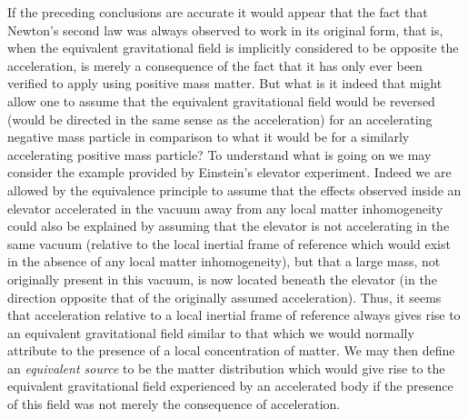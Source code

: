 \documentclass[notitlepage,12pt]{report}
\begin{document}
If the preceding conclusions are accurate it would appear that the fact that Newton's second law was always observed to work in its original form, that is, when the equivalent gravitational field is implicitly considered to be opposite the acceleration, is merely a consequence of the fact that it has only ever been verified to apply using positive mass matter. But what is it indeed that might allow one to assume that the equivalent gravitational field would be reversed (would be directed in the same sense as the acceleration) for an accelerating negative mass particle in comparison to what it would be for a similarly accelerating positive mass particle? To understand what is going on we may consider the example provided by Einstein's elevator experiment. Indeed we are allowed by the equivalence principle to assume that the effects observed inside an elevator accelerated in the vacuum away from any local matter inhomogeneity could also be explained by assuming that the elevator is not accelerating in the same vacuum (relative to the local inertial frame of reference which would exist in the absence of any local matter inhomogeneity), but that a large mass, not originally present in this vacuum, is now located beneath the elevator (in the direction opposite that of the originally assumed acceleration). Thus, it seems that acceleration relative to a local inertial frame of reference always gives rise to an equivalent gravitational field similar to that which we would normally attribute to the presence of a local concentration of matter. We may then define an \textit{equivalent source} to be the matter distribution which would give rise to the equivalent gravitational field experienced by an accelerated body if the presence of this field was not merely the consequence of acceleration.
\end{document}
